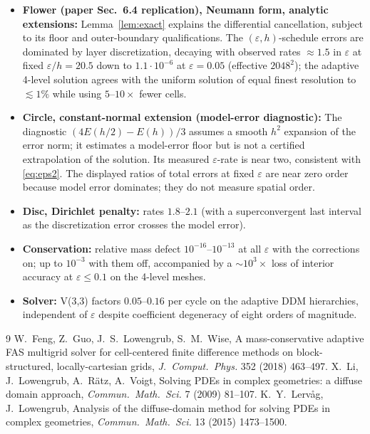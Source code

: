 \documentclass[11pt]{article}
\theoremstyle{remark}
\newcommand{\eps}{\varepsilon}
\begin{document}
\begin{itemize}
\item \textbf{Flower (paper Sec.~6.4 replication), Neumann form,
analytic extensions:} Lemma~\ref{lem:exact} explains the differential
cancellation, subject to its floor and outer-boundary qualifications.
The $(\eps,h)$-schedule errors are dominated by layer discretization,
decaying with observed rates $\approx1.5$ in $\eps$ at fixed
$\eps/h=20.5$ down to $1.1\cdot10^{-6}$ at $\eps=0.05$ (effective
$2048^2$); the adaptive 4-level solution agrees with the uniform
solution of equal finest resolution to $\lesssim1\%$ while using
$5$--$10\times$ fewer cells.
\item \textbf{Circle, constant-normal extension (model-error diagnostic):}
The diagnostic $(4E(h/2)-E(h))/3$ assumes a smooth $h^2$ expansion of
the error norm; it estimates a model-error floor but is not a certified
extrapolation of the solution. Its measured $\eps$-rate is near two,
consistent with \eqref{eq:eps2}. The displayed ratios of total errors
at fixed $\eps$ are near zero order because model error dominates;
they do not measure spatial order.
\item \textbf{Disc, Dirichlet penalty:} rates $1.8$--$2.1$ (with a
superconvergent last interval as the discretization error crosses the
model error).
\item \textbf{Conservation:} relative mass defect
$10^{-16}$--$10^{-13}$ at all $\eps$ with the corrections on; up to
$10^{-3}$ with them off, accompanied by a $\sim10^3\times$ loss of
interior accuracy at $\eps\le0.1$ on the 4-level meshes.
\item \textbf{Solver:} V(3,3) factors $0.05$--$0.16$ per cycle on the
adaptive DDM hierarchies, independent of $\eps$ despite coefficient
degeneracy of eight orders of magnitude.
\end{itemize}

\begin{thebibliography}{9}
 W.~Feng, Z.~Guo, J.~S.~Lowengrub, S.~M.~Wise,
A mass-conservative adaptive FAS multigrid solver for cell-centered
finite difference methods on block-structured, locally-cartesian grids,
\emph{J.~Comput.~Phys.} 352 (2018) 463--497.
 X.~Li, J.~Lowengrub, A.~R\"atz, A.~Voigt, Solving PDEs in
complex geometries: a diffuse domain approach, \emph{Commun.\ Math.\
Sci.} 7 (2009) 81--107.
 K.~Y.~Lerv\r{a}g, J.~Lowengrub, Analysis of
the diffuse-domain method for solving PDEs in complex geometries,
\emph{Commun.\ Math.\ Sci.} 13 (2015) 1473--1500.
\end{thebibliography}
\end{document}
